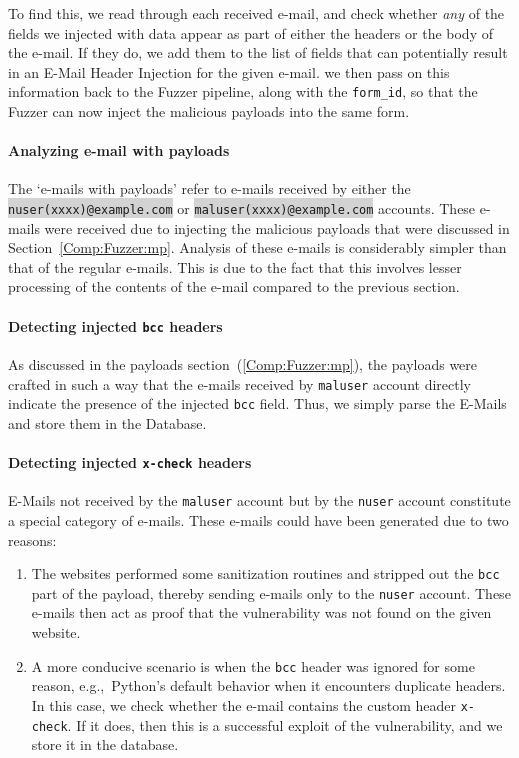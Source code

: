 To find this, we read through each received e-mail, and check whether \emph{any} of the fields we injected with data appear as part of either the headers or the body of the e-mail. If they do, we add them to the list of fields that can potentially result in an E-Mail Header Injection for the given e-mail. we then pass on this information back to the Fuzzer pipeline, along with the \texttt{form\_id}, so that the Fuzzer can now inject the malicious payloads into the same form.

\paragraph{Analyzing e-mail with payloads}
The `e-mails with payloads' refer to e-mails received by either the \colorbox{lightgray}{\lstinline{nuser(xxxx)@example.com}} or \colorbox{lightgray}{\lstinline{maluser(xxxx)@example.com}} accounts. These e-mails were received due to injecting the malicious payloads that were discussed in Section~\ref{Comp:Fuzzer:mp}. Analysis of these e-mails is considerably simpler than that of the regular e-mails. This is due to the fact that this involves lesser processing of the contents of the e-mail compared to the previous section.
\paragraph{Detecting injected \texttt{bcc} headers}
As discussed in the payloads section~(\ref{Comp:Fuzzer:mp}), the payloads were crafted in such a way that the e-mails received by \texttt{maluser} account directly indicate the presence of the injected \texttt{bcc} field. Thus, we simply parse the E-Mails and store them in the Database.

\label{analyze:detect_x_check}
\paragraph{Detecting injected \texttt{x-check} headers}
E-Mails not received by the \texttt{maluser} account but by the \texttt{nuser} account constitute a special category of e-mails.
These e-mails could have been generated due to two reasons:
\begin{enumerate}
	\item The websites performed some sanitization routines and stripped out the \texttt{bcc} part of the payload, thereby sending e-mails only to the \texttt{nuser} account. These e-mails then act as proof that the vulnerability was not found on the given website.
	\item A more conducive scenario is when the \texttt{bcc} header was ignored for some reason, e.g.,\ Python's default behavior when it encounters duplicate headers. In this case, we check whether the e-mail contains the custom header \texttt{x-check}. If it does, then this is a successful exploit of the vulnerability, and we store it in the database.
\end{enumerate}
